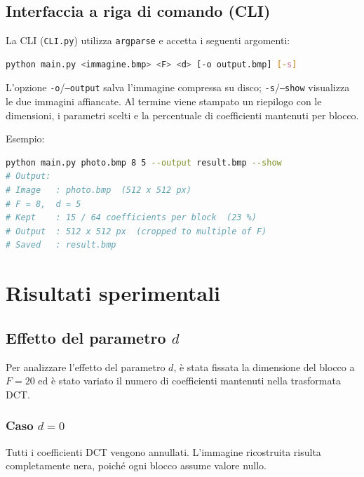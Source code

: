 \documentclass[12pt,a4paper]{article}
\begin{document}
\subsection{Interfaccia a riga di comando (CLI)}

La CLI (\texttt{CLI.py}) utilizza \texttt{argparse} e accetta i seguenti
argomenti:

\begin{lstlisting}[language=bash, caption={Sintassi CLI}]
python main.py <immagine.bmp> <F> <d> [-o output.bmp] [-s]
\end{lstlisting}

L'opzione \texttt{-o}/\texttt{--output} salva l'immagine compressa su disco;
\texttt{-s}/\texttt{--show} visualizza le due immagini affiancate.
Al termine viene stampato un riepilogo con le dimensioni, i parametri scelti
e la percentuale di coefficienti mantenuti per blocco.

Esempio:
\begin{lstlisting}[language=bash]
python main.py photo.bmp 8 5 --output result.bmp --show
# Output:
# Image   : photo.bmp  (512 x 512 px)
# F = 8,  d = 5
# Kept    : 15 / 64 coefficients per block  (23 %)
# Output  : 512 x 512 px  (cropped to multiple of F)
# Saved   : result.bmp
\end{lstlisting}

\section{Risultati sperimentali}

\subsection{Effetto del parametro $d$}

Per analizzare l’effetto del parametro $d$, è stata fissata la dimensione
del blocco a $F = 20$ ed è stato variato il numero di coefficienti mantenuti
nella trasformata DCT.

\subsubsection*{Caso $d = 0$}

Tutti i coefficienti DCT vengono annullati.  
L’immagine ricostruita risulta completamente nera, poiché ogni blocco assume
valore nullo.
\end{document}
